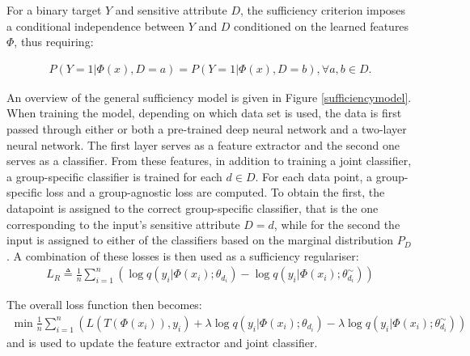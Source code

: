 For a binary target $Y$ and sensitive attribute $D$, the sufficiency criterion imposes a conditional independence between $Y$ and $D$ conditioned on the learned features $\Phi$, thus requiring:

\begin{align*}
P(Y = 1|\Phi(x),D = a) = P(Y = 1|\Phi(x),D = b), \forall a,b\in D.
\end{align*}

An overview of the general sufficiency model is given in Figure \ref{sufficiencymodel}. When training the model, depending on which data set is used, the data is first passed through either or both a pre-trained deep neural network and a two-layer neural network. The first layer serves as a feature extractor and the second one serves as a classifier. From these features, in addition  to training a joint classifier, a group-specific classifier is trained for each $d \in D$. For each data point, a group-specific loss and a group-agnostic loss are computed. To obtain the first, the datapoint is assigned to the correct group-specific classifier, that is the one corresponding to the input's sensitive attribute $D = d$, while for the second the input is assigned to either of the classifiers based on the marginal distribution $P_D$. A combination of these losses is then used as a sufficiency regulariser:
\begin{align*}
    L_R \triangleq \frac{1}{n} \sum\limits_{i=1}^n \left( \log q(y_i|\Phi (x_i); \theta_{d_i})  - \log q(y_i|\Phi (x_i); \theta^{\sim}_{d_i})\right)
\end{align*}

The overall loss function then becomes:
\begin{align*}
    \min \frac{1}{n}\sum\limits_{i=1}^n \left(L(T(\Phi(x_i)), y_i) + \lambda \log q(y_i|\Phi(x_i);\theta_{d_i})-\lambda \log q(y_i|\Phi(x_i);\theta^{\sim}_{d_i})\right)
\end{align*}
and is used to update the feature extractor and joint classifier.

